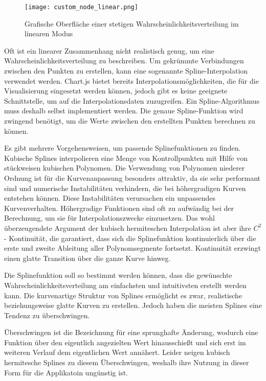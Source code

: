 \begin{figure}[H]
    \centering
    \texttt{[image: custom\_node\_linear.png]}
    \caption{Grafische Oberfläche einer stetigen Wahrscheinlichkeitsverteilung im linearen Modus}
    \label{fig:customnodelinear}
\end{figure}

Oft ist ein linearer Zusammenhang nicht realistisch genug, um eine Wahrscheinlichkeitsverteilung zu beschreiben. Um gekrümmte Verbindungen zwischen den Punkten zu erstellen, kann eine sogenannte Spline-Interpolation verwendet werden. Chart.js bietet bereits Interpolationsmöglichkeiten, die für die Visualisierung eingesetzt werden können, jedoch gibt es keine geeignete Schnittstelle, um auf die Interpolationsdaten zuzugreifen. Ein Spline-Algorithmus muss deshalb selbst implementiert werden. Die genaue Spline-Funktion wird zwingend benötigt, um die Werte zwischen den erstellten Punkten berechnen zu können.

Es gibt mehrere Vorgehensweisen, um passende Splinefunktionen zu finden. 
Kubische Splines interpolieren eine Menge von Kontrollpunkten mit Hilfe von
stückweisen kubischen Polynomen. Die Verwendung von Polynomen niederer Ordnung ist für die Kurvenanpassung besonders attraktiv, da sie sehr performant sind und numerische Instabilitäten verhindern, die bei höhergradigen Kurven entstehen können. Diese Instabilitäten verursachen ein unpassendes Kurvenverhalten. Höhergradige Funktionen sind oft zu aufwändig bei der Berechnung, um sie für Interpolationszwecke einzusetzen. Das wohl überzeugendste
Argument der kubisch hermiteschen Interpolation ist aber ihre $C^2$-
Kontinuität, die garantiert, dass sich die Splinefunktion kontinuierlich über die erste und zweite Ableitung aller Polynomsegmente fortsetzt.
Kontinuität erzwingt einen glatte Transition über die ganze Kurve hinweg. \cite{Wolberg1999}

Die Splinefunktion soll so bestimmt werden können, dass die gewünschte Wahrscheinlichkeitsverteilung am einfachsten und intuitivsten erstellt werden kann. Die kurvenartige Struktur von Splines ermöglicht es zwar, realistische beziehungsweise glatte Kurven zu erstellen. Jedoch haben die meisten Splines eine Tendenz zu überschwingen. 

Überschwingen ist die Bezeichnung für eine sprunghafte Änderung, wodurch eine Funktion über den eigentlich angezielten Wert hinausschießt und sich erst im weiteren Verlauf dem eigentlichen Wert annähert. Leider neigen kubisch hermitesche Splines zu diesem Überschwingen, weshalb ihre Nutzung in dieser Form für die Applikatoin ungünstig ist. \cite{kruger:2007}

